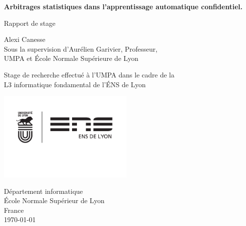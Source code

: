  
\begin{titlepage}
    \begin{center}
        \vspace*{1cm}
            
        \Huge
        \textbf{Arbitrages statistiques dans l'apprentissage automatique confidentiel.}
            
        \vspace{0.5cm}
        \LARGE
        Rapport de stage
            
        \vspace{1.5cm}
            
        \huge {\sc Alexi Canesse}\\\LARGE
        Sous la supervision d'{\sc Aurélien Garivier}, Professeur,\\ UMPA et École Normale Supérieure de Lyon
            
        \vfill
            
        Stage de recherche effectué à l'UMPA dans le cadre de la \\
        L3 informatique fondamental de l'ÉNS de Lyon
            
        \vspace{0.8cm}
            
        \includegraphics[width=0.5\textwidth]{"./proofs/figures/logo co UDL ENS 2016.pdf"}
            
        \Large
        Département informatique\\
        École Normale Supérieur de Lyon\\
        France\\
        \today
            
    \end{center}
\end{titlepage}





\newpage

\tableofcontents
\newpage

